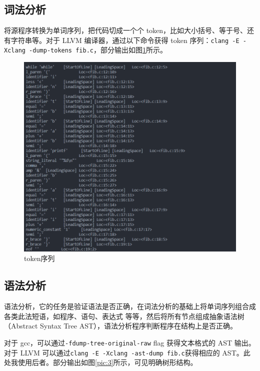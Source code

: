 \documentclass[UTF8,a4paper,10pt]{ctexart}
\begin{document}
\subsection{词法分析}
将源程序转换为单词序列，把代码切成一个个 token，比如大小括号、等于号、还有字符串等。对于 LLVM 编译器，通过以下命令获得 token 序列：\verb|clang -E -Xclang -dump-tokens fib.c|，部分输出如图\ref{pic:2}所示。

\begin{figure}[H]
  \centering
  \includegraphics[width=\textwidth]{figure/token.png}
  \caption{token序列}
  \label{pic:2}
\end{figure}

\subsection{语法分析}
语法分析，它的任务是验证语法是否正确，在词法分析的基础上将单词序列组合成各类此法短语，如程序、语句、表达式 等等，然后将所有节点组成抽象语法树（Abstract Syntax Tree AST），语法分析程序判断程序在结构上是否正确。

对于 gcc，可以通过\verb|-fdump-tree-original-raw| flag 获得文本格式的 AST 输出。对于 LLVM 可以通过\verb|clang -E -Xclang -ast-dump fib.c|获得相应的 AST。此处我使用后者。部分输出如图\ref{pic:3}所示，可见明确树形结构。
\end{document}
